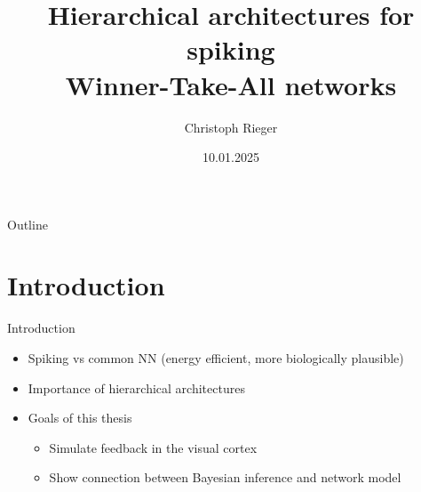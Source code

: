\documentclass[aspectratio=169]{beamer}
\title[Short Title]{ Hierarchical architectures for spiking \\ Winner-Take-All networks}
\author{Christoph Rieger}
\date{10.01.2025}
\institute{IML}
\begin{document}
\begin{frame}[plain]
  \maketitle
\end{frame}


\begin{frame}{Outline}
  \tableofcontents
\end{frame}


\section{Introduction}

\begin{frame}{Introduction}
  \begin{itemize}
    \item Spiking vs common NN (energy efficient, more biologically plausible)
    \item Importance of hierarchical architectures
    \item Goals of this thesis
    \begin{itemize}
      \item Simulate feedback in the visual cortex
      \item Show connection between Bayesian inference and network model
    \end{itemize}
  \end{itemize}
\end{frame}
\end{document}
